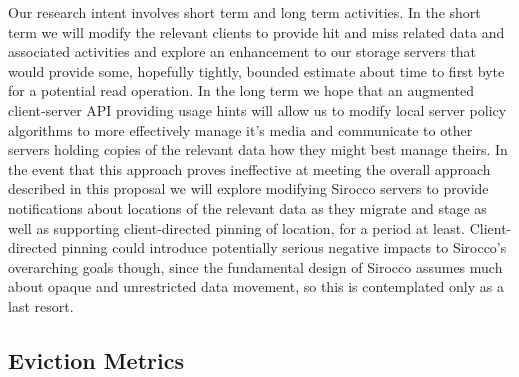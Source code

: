 Our research intent involves short term and long term activities. In the short
term we will modify the relevant clients to provide hit and miss related data
and associated activities and explore an enhancement to our storage servers
that would provide some, hopefully tightly, bounded estimate about time to
first byte for a potential read operation. In the long term we hope that an
augmented client-server API providing usage hints will allow us to modify local
server policy algorithms to more effectively manage it's media and communicate
to other servers holding copies of the relevant data how they might best manage
theirs. In the event that this approach proves ineffective at meeting the
overall approach described in this proposal we will explore modifying Sirocco
servers to provide notifications about locations of the relevant data as they
migrate and stage as well as supporting client-directed pinning of location,
for a period at least. Client-directed pinning could introduce potentially
serious negative impacts to Sirocco's overarching goals though, since the
fundamental design of Sirocco assumes much about opaque and unrestricted data
movement, so this is contemplated only as a last resort.

\subsection{Eviction Metrics}


